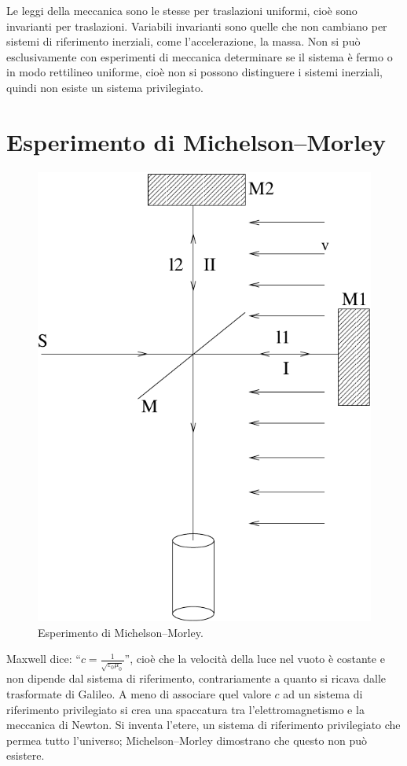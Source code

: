 Le leggi della meccanica sono le stesse per traslazioni uniformi, cioè sono invarianti per traslazioni. Variabili invarianti sono quelle che non cambiano per sistemi di riferimento inerziali, come l'accelerazione, la massa. Non si può esclusivamente con esperimenti di meccanica determinare se il sistema è fermo o in modo rettilineo uniforme, cioè non si possono distinguere i sistemi inerziali, quindi non esiste un sistema privilegiato.

\section{Esperimento di Michelson--Morley}
\begin{figure}[htbp]
   \centering
   \includegraphics[scale=0.7]{immagini/fisica1/Morley}
   \caption{Esperimento di Michelson--Morley.}
\end{figure}
Maxwell dice: ``$c=\frac{1}{\sqrt{\varepsilon_0\mu_0}}$'', cioè che la velocità della luce nel vuoto è costante e non dipende dal sistema di riferimento, contrariamente a quanto si ricava dalle trasformate di Galileo. A meno di associare quel valore $c$ ad un sistema di riferimento privilegiato si crea una spaccatura tra l'elettromagnetismo e la meccanica di Newton. Si inventa l'etere, un sistema di riferimento privilegiato che permea tutto l'universo; Michelson--Morley dimostrano che questo non può esistere.

